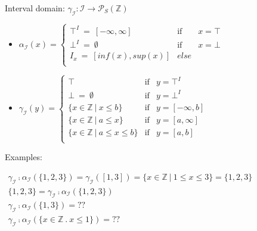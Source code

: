\begin{frame}{Interval domain: $\gamma_{\scriptscriptstyle\mathcal{I}}: \mathcal{I} \rightarrow \mathcal{P}_S(\mathbb{Z})$}
\begin{itemize}
	\item $\alpha_{\scriptscriptstyle\mathcal{I}}(x)=
	 \left\{ \begin{array}{lcc}
	\top^I~=~[-\infty,\infty]  &  \text{if} & x=\top  \\
	\bot^I~=~\emptyset  &  \text{if} & x=\bot \\
     I_x~=~[inf(x), sup(x)]   &  else &   \\
	\end{array}\right.$  
		\item $\gamma_{\scriptscriptstyle\mathcal{I}}(y)=
	\left\{ \begin{array}{lcl}
	\top &  \text{if} & y=\top^I  \\
	\bot~=~\emptyset  &  \text{if} & y=\bot^I \\
	\{x \in \mathbb{Z} ~|~ x \leq b \}&  \text{if} & y = [-\infty,b]  \\
	\{x \in \mathbb{Z} ~|~ a \leq x  \}&  \text{if} & y = [a,\infty]  \\
	\{x \in \mathbb{Z} ~|~ a \leq x \leq b\} &  \text{if} & y = [a,b]  \\
	\end{array}\right.$
\end{itemize}
\begin{exampleblock}{Examples:}
	
	$\begin{array}{l}
	 \gamma_{\scriptscriptstyle\mathcal{I}} \comp \alpha_{\scriptscriptstyle\mathcal{I}} (\{1,2,3\})= \gamma_{\scriptscriptstyle\mathcal{I}}([1,3])= {\scriptstyle \{x \in \mathbb{Z}~|~ 1 \leq x \leq 3\}} =\{1,2,3\}  \\
	 \{1,2,3\} =  \gamma_{\scriptscriptstyle\mathcal{I}} \comp \alpha_{\scriptscriptstyle\mathcal{I}} (\{1,2,3\})\\
 \gamma_{\scriptscriptstyle\mathcal{I}} \comp \alpha_{\scriptscriptstyle\mathcal{I}} (\{1,3\})= ??\\
	 \gamma_{\scriptscriptstyle\mathcal{I}} \comp \alpha_{\scriptscriptstyle\mathcal{I}} (\{x \in \mathbb{Z}~.~x\leq 1\})= ??
	\end{array}$\\
	
\end{exampleblock}
\end{frame}

